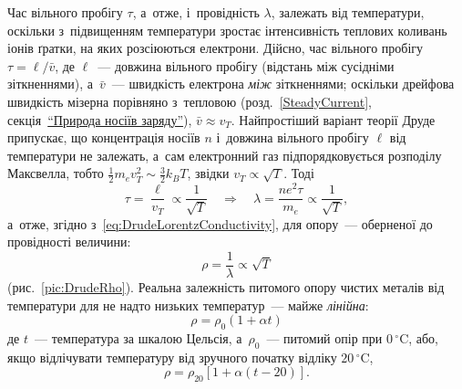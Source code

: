 Час вільного пробігу $\tau$, а~отже, і~провідність $\lambda$, залежать від температури,
оскільки з~підвищенням температури зростає інтенсивність теплових коливань іонів ґратки,
на яких розсіюються електрони. Дійсно, час вільного пробігу $\tau = \ell/\bar v$, де
$\ell$~--- довжина вільного пробігу (відстань між сусідніми зіткненнями), а~$\bar v$~---
швидкість електрона \emph{між} зіткненнями; оскільки дрейфова швидкість мізерна порівняно
з~тепловою (розд.~\ref{SteadyCurrent},
секція~\hyperlink{charge-carriers-nature}{\enquote{Природа носіїв заряду}}), $\bar{v}\approx v_T$. Найпростіший варіант теорії Друде припускає, що концентрація носіїв $n$
і~довжина вільного пробігу $\ell$ від температури не залежать, а~сам електронний газ
підпорядковується розподілу Максвелла, тобто $\tfrac12 m_e v_T^2 \sim \tfrac32 k_BT$,
звідки $v_T\propto\sqrt T$. Тоді
\begin{equation*}
	\tau = \frac{\ell}{v_T} \propto \frac1{\sqrt T} \quad\Rightarrow\quad
	\lambda = \frac{ne^2\tau}{m_e} \propto \frac1{\sqrt T},
\end{equation*}
а~отже, згідно з~\eqref{eq:DrudeLorentzConductivity}, для опору~--- оберненої до
провідності величини:
\begin{equation*}
	\rho = \frac1\lambda \propto \sqrt T
\end{equation*}
(рис.~\ref{pic:DrudeRho}). Реальна залежність питомого опору чистих металів від
температури для не надто низьких температур~--- майже \emph{лінійна}:
\begin{equation}\label{eq:TempDependence1}
	\rho = \rho_0\left(1 + \alpha t\right)
\end{equation}
де $t$~--- температура за шкалою Цельсія, а~$\rho_0$~--- питомий опір при $0\,^\circ$C,
або, якщо відлічувати температуру від зручного початку відліку $20\,^\circ$C,
\begin{equation}\label{eq:TempDependence2}
	\rho = \rho_{20}\left[1 + \alpha(t - 20)\right].
\end{equation}

